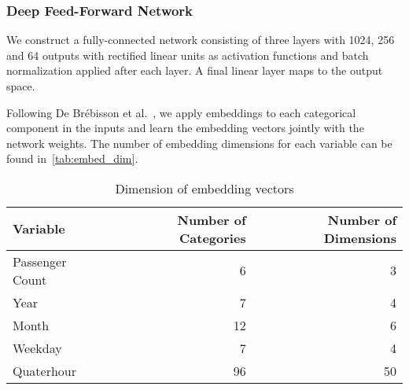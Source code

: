 \subsubsection{Deep Feed-Forward Network}%
\label{ssub:deep_neural_network}

We construct a fully-connected network consisting of three layers with 1024,
256 and 64 outputs with rectified linear units as activation functions and
batch normalization applied after each layer. A final linear layer maps to the
output space.

Following De Br{\'e}bisson et al.~\cite{de2015artificial}, we apply embeddings
to each categorical component in the inputs and learn the embedding vectors
jointly with the network weights. The number of embedding dimensions for each
variable can be found in~\autoref{tab:embed_dim}.

\begin{table}[htb!]
    \centering
    \caption{Dimension of embedding vectors}
    \label{tab:embed_dim}
    \begin{tabular}{lrr}
        \toprule
        Variable & Number of Categories & Number of Dimensions \\
        \midrule
        Passenger Count &  6 &  3 \\
        Year            &  7 &  4 \\
        Month           & 12 &  6 \\
        Weekday         &  7 &  4 \\
        Quaterhour      & 96 & 50 \\
        \bottomrule
    \end{tabular}
\end{table}

